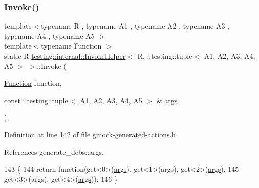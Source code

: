 \subsubsection{\texorpdfstring{Invoke()}{Invoke()}}
{\footnotesize\ttfamily template$<$typename R , typename A1 , typename A2 , typename A3 , typename A4 , typename A5 $>$ \\
template$<$typename Function $>$ \\
static R \hyperlink{classtesting_1_1internal_1_1InvokeHelper}{testing\+::internal\+::\+Invoke\+Helper}$<$ R, \+::testing\+::tuple$<$ A1, A2, A3, A4, A5 $>$ $>$\+::Invoke (\begin{DoxyParamCaption}\item[{\hyperlink{structtesting_1_1internal_1_1Function}{Function}}]{function,  }\item[{const \+::testing\+::tuple$<$ A1, A2, A3, A4, A5 $>$ \&}]{args }\end{DoxyParamCaption})\hspace{0.3cm}{\ttfamily [inline]}, {\ttfamily [static]}}



Definition at line 142 of file gmock-\/generated-\/actions.\+h.



References generate\+\_\+debs\+::args.


\begin{DoxyCode}
143                  \{
144            \textcolor{keywordflow}{return} \textcolor{keyword}{function}(get<0>(\hyperlink{namespacegenerate__debs_a75f9143e38df82d83b2e8a6f99cae02c}{args}), get<1>(args), get<2>(\hyperlink{namespacegenerate__debs_a75f9143e38df82d83b2e8a6f99cae02c}{args}),
145                get<3>(args), get<4>(\hyperlink{namespacegenerate__debs_a75f9143e38df82d83b2e8a6f99cae02c}{args}));
146   \}
\end{DoxyCode}
\mbox{\label{classtesting_1_1internal_1_1InvokeHelper_3_01R_00_01_1_1testing_1_1tuple_3_01A1_00_01A2_00_01A3_00_01A4_00_01A5_01_4_01_4_a5748d33ebff032886c73d88f4b511d87}} 
